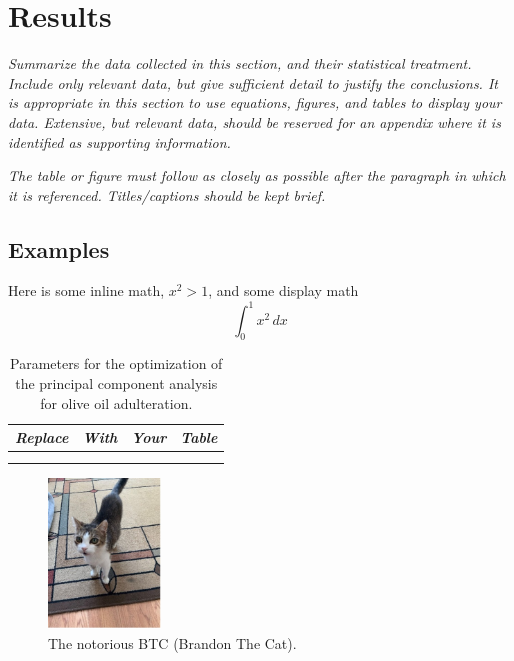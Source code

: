 \documentclass[11pt,a4paper,oneside]{report}
\newcommand{\instructions}[1]{{\color{black}\itshape #1}}
\begin{document}

\chapter{Results}
\label{results}

\instructions{Summarize the data collected in this section, and their
statistical treatment. Include only relevant data, but give sufficient
detail to justify the conclusions. It is appropriate in this section to
use equations, figures, and tables to display your data. Extensive, but
relevant data, should be reserved for an appendix where it is identified
as supporting information.}

\instructions{The table or figure must follow as closely as possible after the
paragraph in which it is referenced. Titles/captions should be kept
brief.}

\section{Examples}

Here is some inline math, $x^2 > 1$, and some display math
\begin{equation}
  \int_0^1 x^2 \, dx
\end{equation}

\begin{table}[htbp]
\centering
\begin{tabular}{@{}llll@{}}
\toprule
\emph{Replace} & \emph{With} & \emph{Your} & \emph{Table} \\
\midrule
& & & \\
& & & \\
\bottomrule
\end{tabular}
\caption{Parameters for the optimization of the principal component analysis for
olive oil adulteration.}
\label{tbl:2}
\end{table}


\begin{figure}[htbp]
\centering
\includegraphics[height=4cm]{btc.jpg}
\caption{The notorious BTC (Brandon The Cat).}
\label{fig:1}
\end{figure}
\end{document}
